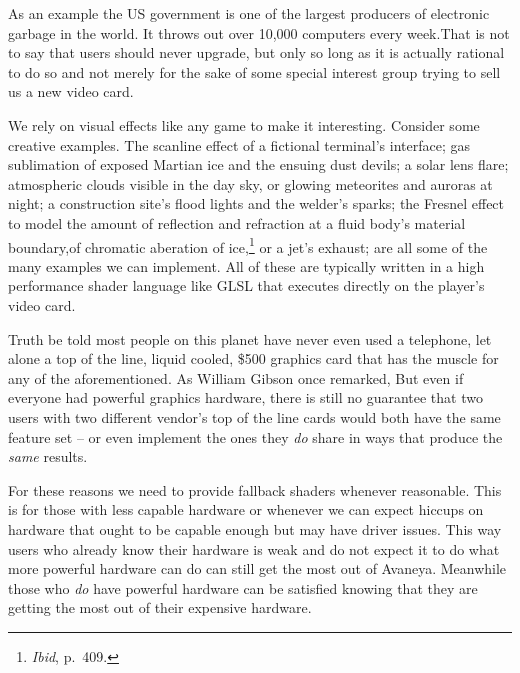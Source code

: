 As an example the US government is one of the largest producers of electronic garbage in the world. It throws out over 10,000 computers every week.\footnotecite[urbina2013] That is not to say that users should never upgrade, but only so long as it is actually rational to do so and not merely for the sake of some special interest group trying to sell us a new video card.
    {}

We rely on visual effects like any game to make it interesting. Consider some creative examples. The scanline effect of a fictional terminal's interface; gas sublimation of exposed Martian ice and the ensuing dust devils; a solar lens flare; atmospheric  clouds visible in the day sky, or glowing meteorites and auroras at night; a construction site's flood lights and the welder's sparks; the Fresnel effect to model the amount of reflection and refraction at a fluid body's material boundary, of chromatic aberation of ice,\footnote{{\it Ibid}, p.~409.} or a jet's exhaust; are all some of the many examples we can implement. All of these are typically written in a high performance shader language like GLSL that executes directly on the player's video card.

Truth be told most people on this planet have never even used a telephone, let alone a top of the line, liquid cooled, \$500 graphics card that has the muscle for any of the aforementioned. As William Gibson once remarked,  But even if everyone had powerful graphics hardware, there is still no guarantee that two users with two different vendor's top of the line cards would both have the same feature set -- or even implement the ones they {\it do} share in ways that produce the {\it same} results. 

For these reasons we need to provide fallback shaders whenever reasonable. This is for those with less capable hardware or whenever we can expect hiccups on hardware that ought to be capable enough but may have driver issues. This way users who already know their hardware is weak and do not expect it to do what more powerful hardware can do can still get the most out of Avaneya. Meanwhile those who {\it do} have powerful hardware can be satisfied knowing that they are getting the most out of their expensive hardware.

